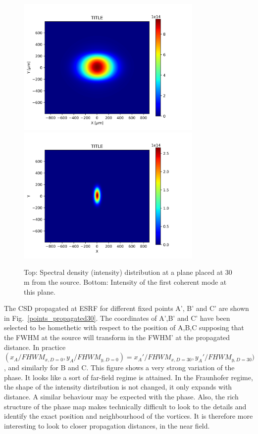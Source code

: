 \documentclass{iucr}              %
\begin{document}
\begin{figure}\label{spectral_density_propagated}
\caption{Top: Spectral density (intensity) distribution at a plane placed at 30 m from the source. Bottom: Intensity of the first coherent mode at this plane.}
\includegraphics[width=9.0cm]{Figures/spectral_density_upto1099_propagated.png}
\includegraphics[width=9.0cm]{Figures/spectral_density_upto0000_propagated.png}
\end{figure}

The CSD propagated at ESRF for different fixed points A', B' and C' are shown in Fig.~\ref{points_propagated30}. The coordinates of A',B' and C' have been selected to be homethetic with respect to the position of A,B,C supposing that the FWHM at the source will transform in the FWHM' at the propagated distance. In practice $(x_A/FHWM_{x,D=0},y_A/FHWM_{y,D=0})=x_A'/FHWM_{x,D=30},y_A'/FHWM_{y,D=30})$, and similarly for B and C. This figure shows a very strong variation of the phase. It looks like a sort of far-field regime is attained. In the Fraunhofer regime, the shape of the intensity distribution is not changed, it only expands with distance. A similar behaviour may be expected with the phase. Also, the rich structure of the phase map makes technically difficult to look to the details and identify the exact position and neighbourhood of the vortices. It is therefore more interesting to look to closer propagation distances, in the near field. 
\end{document}
